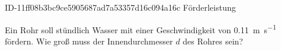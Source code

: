 \begin{exercise}
      {ID-11ff08b3bc9ce5905687ad7a53357d16c094a16c}
      {Förderleistung}
  \ifproblem\problem\par
    Ein Rohr soll stündlich  Wasser mit einer Geschwindigkeit von
    \SI{0.11}{\metre\per\second} fördern. Wie groß muss der Innendurchmesser
    $d$ des Rohres sein?
  \fi
\end{exercise}
